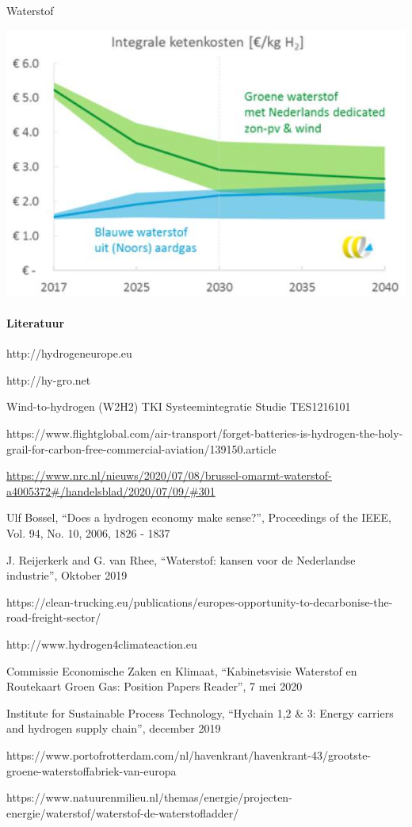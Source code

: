 \begin{voorstel}{Waterstof}
\begin{aanbevelingen}
\includegraphics[width=.5\textwidth]{img/energie/waterstof-ketenkosten}

\end{aanbevelingen}

\paragraph{Literatuur}
http://hydrogeneurope.eu

http://hy-gro.net

Wind-to-hydrogen (W2H2) TKI Systeemintegratie Studie TES1216101

https://www.flightglobal.com/air-transport/forget-batteries-is-hydrogen-the-holy-grail-for-carbon-free-commercial-aviation/139150.article

\url{https://www.nrc.nl/nieuws/2020/07/08/brussel-omarmt-waterstof-a4005372#/handelsblad/2020/07/09/#301}

Ulf Bossel, “Does a hydrogen economy make sense?”, Proceedings of the IEEE, Vol. 94, No. 10, 2006, 1826 - 1837

J. Reijerkerk and G. van Rhee, “Waterstof: kansen voor de Nederlandse industrie”, Oktober 2019

https://clean-trucking.eu/publications/europes-opportunity-to-decarbonise-the-road-freight-sector/

http://www.hydrogen4climateaction.eu

Commissie Economische Zaken en Klimaat, “Kabinetsvisie Waterstof en Routekaart Groen Gas: Position Papers Reader”, 7 mei 2020

Institute for Sustainable Process Technology, “Hychain 1,2 \& 3: Energy carriers and hydrogen supply chain”, december 2019

https://www.portofrotterdam.com/nl/havenkrant/havenkrant-43/grootste-groene-waterstoffabriek-van-europa

https://www.natuurenmilieu.nl/themas/energie/projecten-energie/waterstof/waterstof-de-waterstofladder/


\end{voorstel}
